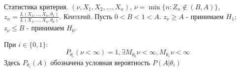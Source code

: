 

Статистика критерия. $(\nu, X_1, X_2, \dots, X_n)$,
 $\nu = \min \{ n : Z_n \notin (B, A) \}$,
$z_n = \frac{L(X_1, \dots, X_n, \theta_1)}{L(X_1, \dots, X_n, \theta_0)}$.
\textsc{Критерий}. Пусть $0<B<1<A$.
$z_\nu \geqslant A$ - принимаем $H_1$; $z_\nu \leqslant B$ - принимаем $H_0$.

\begin{theorem}
  При $i \in \{ 0, 1 \}$:
  \[
    P_{\theta_i}(\nu < \infty) = 1, \exists M_{\theta_0} \nu < \infty, M_{\theta_1} \nu < \infty
  \]
  Здесь $P_{\theta_i} (A)$ обозначена условная вероятность $P(A | \theta_i)$
\end{theorem}

